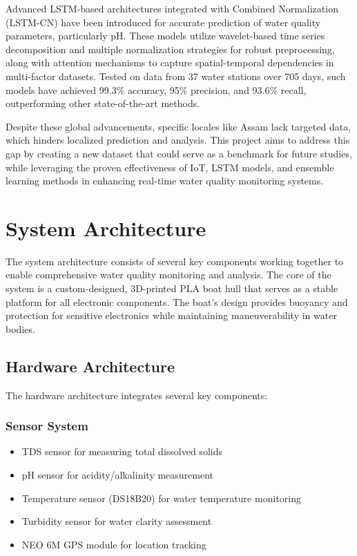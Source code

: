 \documentclass[conference]{IEEEtran}
\begin{document}
Advanced LSTM-based architectures integrated with Combined Normalization (LSTM-CN) have been introduced for accurate prediction of water quality parameters, particularly pH. These models utilize wavelet-based time series decomposition and multiple normalization strategies for robust preprocessing, along with attention mechanisms to capture spatial-temporal dependencies in multi-factor datasets. Tested on data from 37 water stations over 705 days, such models have achieved 99.3\% accuracy, 95\% precision, and 93.6\% recall, outperforming other state-of-the-art methods.

Despite these global advancements, specific locales like Assam lack targeted data, which hinders localized prediction and analysis. This project aims to address this gap by creating a new dataset that could serve as a benchmark for future studies, while leveraging the proven effectiveness of IoT, LSTM models, and ensemble learning methods in enhancing real-time water quality monitoring systems.

\section{System Architecture}
The system architecture consists of several key components working together to enable comprehensive water quality monitoring and analysis. The core of the system is a custom-designed, 3D-printed PLA boat hull that serves as a stable platform for all electronic components. The boat's design provides buoyancy and protection for sensitive electronics while maintaining maneuverability in water bodies.

\subsection{Hardware Architecture}
The hardware architecture integrates several key components:

\subsubsection{Sensor System}
\begin{itemize}
\item TDS sensor for measuring total dissolved solids
\item pH sensor for acidity/alkalinity measurement
\item Temperature sensor (DS18B20) for water temperature monitoring
\item Turbidity sensor for water clarity assessment
\item NEO 6M GPS module for location tracking
\end{itemize}
\end{document}
